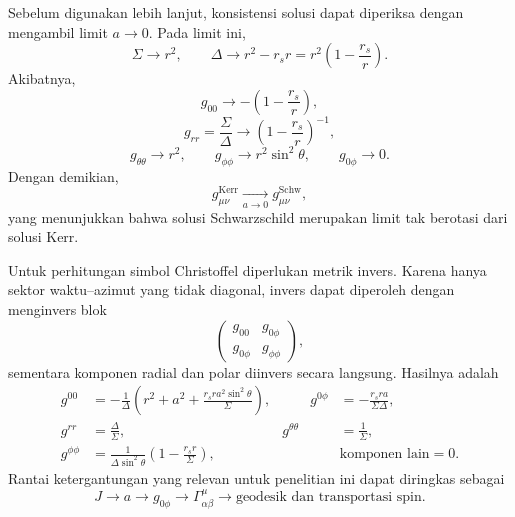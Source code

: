 Sebelum digunakan lebih lanjut, konsistensi solusi dapat diperiksa dengan
mengambil limit $a\rightarrow0$. Pada limit ini,
\begin{equation}
    \Sigma\rightarrow r^2,
    \qquad
    \Delta\rightarrow r^2-r_sr
    =r^2\left(1-\frac{r_s}{r}\right).
\end{equation}
Akibatnya,
\begin{equation}
    g_{00}
    \rightarrow
    -\left(1-\frac{r_s}{r}\right),
\end{equation}
\begin{equation}
    g_{rr}
    =\frac{\Sigma}{\Delta}
    \rightarrow
    \left(1-\frac{r_s}{r}\right)^{-1},
\end{equation}
\begin{equation}
    g_{\theta\theta}\rightarrow r^2,
    \qquad
    g_{\phi\phi}\rightarrow r^2\sin^2\!\theta,
    \qquad
    g_{0\phi}\rightarrow0.
\end{equation}
Dengan demikian,
\begin{equation}
    g_{\mu\nu}^{\mathrm{Kerr}}
    \xrightarrow[a\to0]{}
    g_{\mu\nu}^{\mathrm{Schw}},
    \label{eq:kerr-schwarzschild-limit}
\end{equation}
yang menunjukkan bahwa solusi Schwarzschild merupakan limit tak berotasi
dari solusi Kerr.

Untuk perhitungan simbol Christoffel diperlukan metrik invers. Karena hanya
sektor waktu--azimut yang tidak diagonal, invers dapat diperoleh dengan
menginvers blok
\begin{equation}
    \begin{pmatrix}
        g_{00} & g_{0\phi}\\
        g_{0\phi} & g_{\phi\phi}
    \end{pmatrix},
\end{equation}
sementara komponen radial dan polar diinvers secara langsung. Hasilnya
adalah
\begin{equation}
\begin{aligned}
    g^{00}
    &=-\frac{1}{\Delta}
    \left(
        r^2+a^2+
        \frac{r_sra^2\sin^2\!\theta}{\Sigma}
    \right),
    &\qquad
    g^{0\phi}
    &=-\frac{r_sra}{\Sigma\Delta},
    \\[6pt]
    g^{rr}
    &=\frac{\Delta}{\Sigma},
    &
    g^{\theta\theta}
    &=\frac{1}{\Sigma},
    \\[6pt]
    g^{\phi\phi}
    &=\frac{1}{\Delta\sin^2\!\theta}
    \left(1-\frac{r_sr}{\Sigma}\right),
    &
    &\text{komponen lain}=0.
\end{aligned}
    \label{eq:kerr-inverse}
\end{equation}
Rantai ketergantungan yang relevan untuk penelitian ini dapat diringkas
sebagai
\begin{equation}
    J
    \longrightarrow
    a
    \longrightarrow
    g_{0\phi}
    \longrightarrow
    \Gamma^\mu_{\alpha\beta}
    \longrightarrow
    \text{geodesik dan transportasi spin}.
    \label{eq:kerr-research-chain}
\end{equation}


